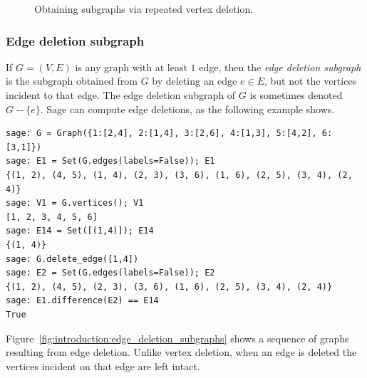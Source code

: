 \begin{figure}[!htbp]
{}
\caption{Obtaining subgraphs via repeated vertex deletion.}
\label{fig:introduction:vertex_deletion_subgraphs}
\end{figure}



\subsubsection{Edge deletion subgraph}

If $G = (V,E)$ is any graph with at least $1$ edge, then the
\emph{edge deletion subgraph} is the subgraph obtained from $G$ by
deleting an edge $e \in E$, but not the vertices incident to that edge.
The edge deletion subgraph of $G$ is sometimes denoted $G - \{e\}$.
Sage can compute edge deletions, as the following example shows.
\begin{lstlisting}
sage: G = Graph({1:[2,4], 2:[1,4], 3:[2,6], 4:[1,3], 5:[4,2], 6:[3,1]})
sage: E1 = Set(G.edges(labels=False)); E1
{(1, 2), (4, 5), (1, 4), (2, 3), (3, 6), (1, 6), (2, 5), (3, 4), (2, 4)}
sage: V1 = G.vertices(); V1
[1, 2, 3, 4, 5, 6]
sage: E14 = Set([(1,4)]); E14
{(1, 4)}
sage: G.delete_edge([1,4])
sage: E2 = Set(G.edges(labels=False)); E2
{(1, 2), (4, 5), (2, 3), (3, 6), (1, 6), (2, 5), (3, 4), (2, 4)}
sage: E1.difference(E2) == E14
True
\end{lstlisting}
Figure~\ref{fig:introduction:edge_deletion_subgraphs} shows a sequence
of graphs resulting from edge deletion. Unlike vertex deletion, when
an edge is deleted the vertices incident on that edge are left
intact.

